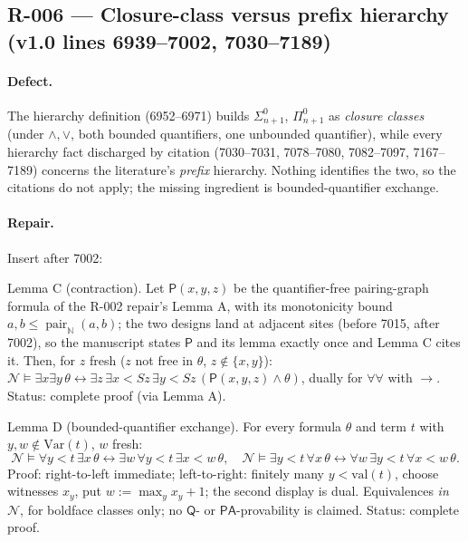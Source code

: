 \subsection*{R-006 --- Closure-class versus prefix hierarchy (v1.0 lines 6939--7002, 7030--7189)}

\paragraph{Defect.} The hierarchy definition (6952--6971) builds \(\Sigma^0_{n+1}\), \(\Pi^0_{n+1}\) as \emph{closure classes} (under \(\land,\lor\), both bounded quantifiers, one unbounded quantifier), while every hierarchy fact discharged by citation (7030--7031, 7078--7080, 7082--7097, 7167--7189) concerns the literature's \emph{prefix} hierarchy.  Nothing identifies the two, so the citations do not apply; the missing ingredient is bounded-quantifier exchange.

\paragraph{Repair.} Insert after 7002:

Lemma C (contraction).  Let \(\mathsf P(x,y,z)\) be the quantifier-free pairing-graph formula of the R-002 repair's Lemma A, with its monotonicity bound \(a,b\le\operatorname{pair}_{\mathbb N}(a,b)\); the two designs land at adjacent sites (before 7015, after 7002), so the manuscript states \(\mathsf P\) and its lemma exactly once and Lemma C cites it.  Then, for \(z\) fresh (\(z\) not free in \(\theta\), \(z\notin\{x,y\}\)): \(\mathcal N\models\exists x\exists y\,\theta\leftrightarrow\exists z\,\exists x\!<\!Sz\,\exists y\!<\!Sz\,(\mathsf P(x,y,z)\land\theta)\), dually for \(\forall\forall\) with \(\to\).  Status: complete proof (via Lemma A).

Lemma D (bounded-quantifier exchange).  For every formula \(\theta\) and term \(t\) with \(y,w\notin\mathrm{Var}(t)\), \(w\) fresh:
\[
  \mathcal N\models\forall y\!<\!t\,\exists x\,\theta\leftrightarrow\exists w\,\forall y\!<\!t\,\exists x\!<\!w\,\theta,
  \quad
  \mathcal N\models\exists y\!<\!t\,\forall x\,\theta\leftrightarrow\forall w\,\exists y\!<\!t\,\forall x\!<\!w\,\theta .
\]
Proof: right-to-left immediate; left-to-right: finitely many \(y<\mathrm{val}(t)\), choose witnesses \(x_y\), put \(w:=\max_y x_y+1\); the second display is dual.  Equivalences \emph{in \(\mathcal N\)}, for boldface classes only; no \(\mathsf Q\)- or \(\mathsf{PA}\)-provability is claimed.  Status: complete proof.

